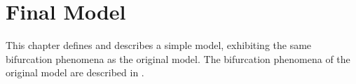 \chapter{Final Model}

This chapter defines and describes a simple model, exhibiting the same bifurcation phenomena as the original model.
The bifurcation phenomena of the original model are described in .









